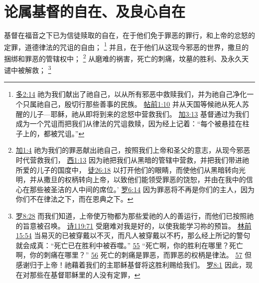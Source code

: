 \documentclass[12pt, a4paper, oneside]{ctexart}
\newcounter{parnum}[section]
\newcommand{\N}{%
   \noindent\refstepcounter{parnum}%
    \makebox[\parindent][l]{\textbf{\arabic{parnum}.}}}
\begin{document}
\section{论属基督的自在、及良心自在}

\N 基督在福音之下已为信徒赎取的自在，在于他们免于罪恶的罪行，和上帝的忿怒的定罪，道德律法的咒诅的自由；
	\footnote {
		\href{https://biblehub.com/titus/2-14.htm}{多2:14} 祂为我们献出了祂自己，以从所有邪恶中救赎我们，并为祂自己净化一个只属祂自己，殷切行那些善事的民族。
		\href{https://biblehub.com/1_thessalonians/1-10.htm}{帖前1:10} 并从天国等候祂从死人苏醒的儿子---耶稣，祂从即将到来的忿怒中营救我们。
		\href{https://biblehub.com/galatians/3-13.htm}{加3:13} 基督通过为我们成为一个咒诅而把我们从律法的咒诅救赎，因为经上记着：“每个被悬挂在柱子上的，都被咒诅。”
	}
	并且，在于他们从这现今邪恶的世界，撒旦的捆绑和罪恶的管辖权中；
	\footnote {
		\href{https://biblehub.com/galatians/1-4.htm}{加1:4} 祂为我们的罪恶献出祂自己，按照我们上帝和圣父的意志，从现今邪恶时代营救我们，
		\href{https://biblehub.com/colossians/1-13.htm}{西1:13} 因为祂把我们从黑暗的管辖中营救，并把我们带进祂所爱的儿子的国度中，
		\href{https://biblehub.com/acts/26-18.htm}{徒26:18} 以打开他们的眼睛，而使他们从黑暗转向光明，并从撒旦的权柄转向上帝，以致他们能领受罪恶的饶恕，并由在我中的信心在那些被圣洁的人中间的席位。’
		\href{https://biblehub.com/romans/6-14.htm}{罗6:14} 因为罪恶将不再是你们的主人，因为你们不在律法之下，而在恩典之下。
	}
	从磨难的祸害，死亡的刺痛，坟墓的胜利、及永久天谴中被解救；
	\footnote {
		\href{https://biblehub.com/romans/8-28.htm}{罗8:28} 而我们知道，上帝使万物都为那些爱祂的人的善运行，而他们已按照祂的旨意被召唤。
		\href{https://biblehub.com/psalms/119-71.htm}{诗119:71} 受磨难对我是好的，以使我能学习祢的预旨。
		\href{https://biblehub.com/1_corinthians/15-54.htm}{林前15:54} 当易灭的已被穿戴以不灭，而凡人被穿戴以不朽，那么经上所记的警句就会成真：“死亡已在胜利中被吞噬。”
		\href{https://biblehub.com/1_corinthians/15-55.htm}{55} “死亡啊，你的胜利在哪里？死亡啊，你的刺痛在哪里？”
		\href{https://biblehub.com/1_corinthians/15-56.htm}{56} 死亡的刺痛是罪恶，而罪恶的权柄是律法。
		\href{https://biblehub.com/1_corinthians/15-57.htm}{57} 但感谢归于上帝！祂藉着我们的主耶稣基督将这胜利赐给我们。
		\href{https://biblehub.com/romans/8-1.htm}{罗8:1} 因此，现在对那些在基督耶稣里的人没有定罪，
	}
\end{document}
